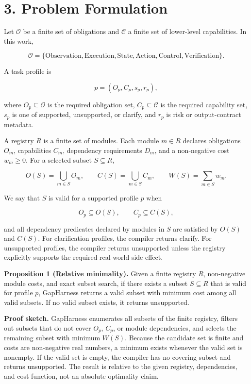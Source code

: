 \documentclass[
  10pt,
]{article}
\begin{document}
\section{3. Problem Formulation}\label{problem-formulation}

Let \(\mathcal{O}\) be a finite set of obligations and \(\mathcal{C}\) a
finite set of lower-level capabilities. In this work,

\[
\mathcal{O}=\{\text{Observation},\text{Execution},\text{State},\text{Action},\text{Control},\text{Verification}\}.
\]

A task profile is

\[
p=(O_p,C_p,s_p,r_p),
\]

where \(O_p\subseteq\mathcal{O}\) is the required obligation set,
\(C_p\subseteq\mathcal{C}\) is the required capability set, \(s_p\) is
one of supported, unsupported, or clarify, and \(r_p\) is risk or
output-contract metadata.

A registry \(R\) is a finite set of modules. Each module \(m\in R\)
declares obligations \(O_m\), capabilities \(C_m\), dependency
requirements \(D_m\), and a non-negative cost \(w_m\ge 0\). For a
selected subset \(S\subseteq R\),

\[
O(S)=\bigcup_{m\in S}O_m,\qquad C(S)=\bigcup_{m\in S}C_m,\qquad W(S)=\sum_{m\in S}w_m.
\]

We say that \(S\) is valid for a supported profile \(p\) when

\[
O_p\subseteq O(S),\qquad C_p\subseteq C(S),
\]

and all dependency predicates declared by modules in \(S\) are satisfied
by \(O(S)\) and \(C(S)\). For clarification profiles, the compiler
returns clarify. For unsupported profiles, the compiler returns
unsupported unless the registry explicitly supports the required
real-world side effect.

\textbf{Proposition 1 (Relative minimality).} Given a finite registry
\(R\), non-negative module costs, and exact subset search, if there
exists a subset \(S\subseteq R\) that is valid for profile \(p\),
GapHarness returns a valid subset with minimum cost among all valid
subsets. If no valid subset exists, it returns unsupported.

\textbf{Proof sketch.} GapHarness enumerates all subsets of the finite
registry, filters out subsets that do not cover \(O_p\), \(C_p\), or
module dependencies, and selects the remaining subset with minimum
\(W(S)\). Because the candidate set is finite and costs are non-negative
real numbers, a minimum exists whenever the valid set is nonempty. If
the valid set is empty, the compiler has no covering subset and returns
unsupported. The result is relative to the given registry, dependencies,
and cost function, not an absolute optimality claim.
\end{document}
